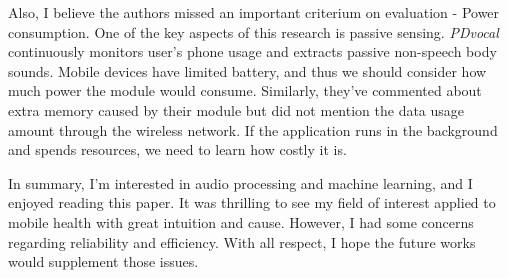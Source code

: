 \documentclass[10pt,a4paper]{article}
\begin{document}
	Also, I believe the authors missed an important criterium on evaluation - Power consumption. One of the key aspects of this research is passive sensing. \textit{PDvocal} continuously monitors user's phone usage and extracts passive non-speech body sounds. Mobile devices have limited battery, and thus we should consider how much power the module would consume. Similarly, they've commented about extra memory caused by their module but did not mention the data usage amount through the wireless network. If the application runs in the background and spends resources, we need to learn how costly it is.
	
	In summary, I'm interested in audio processing and machine learning,  and I enjoyed reading this paper. It was thrilling to see my field of interest applied to mobile health with great intuition and cause. However, I had some concerns regarding reliability and efficiency. With all respect, I hope the future works would supplement those issues.
		
\end{document}
